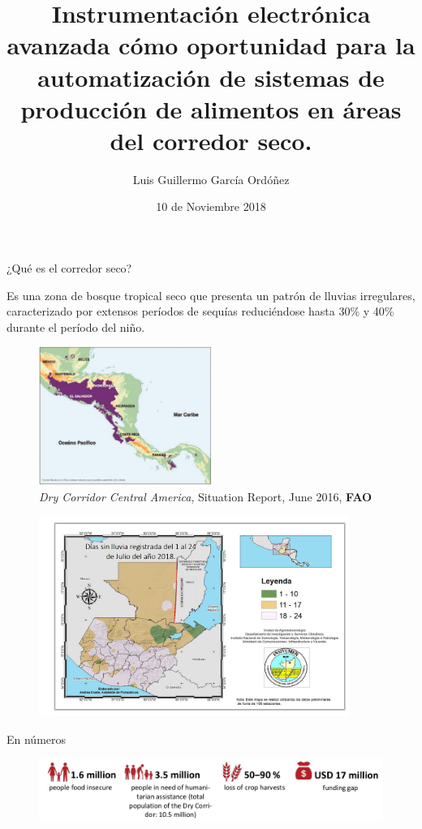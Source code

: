 \documentclass[]{beamer}
\title{Instrumentación electrónica avanzada cómo oportunidad para la automatización de sistemas de producción de alimentos en áreas del corredor seco.}
\author{Luis Guillermo García Ordóñez}
\date{10 de Noviembre 2018}
\begin{document}
\maketitle

\begin{frame}{¿Qué es el corredor seco?}

Es una zona de bosque tropical seco que presenta un patrón de lluvias irregulares, caracterizado por extensos períodos de sequías reduciéndose hasta 30\% y 40\% durante el período del niño.
\begin{figure}
    \centering
    \includegraphics[width=0.5\textwidth]{Docs/Mapa_CS}
    \caption{\small \textit{Dry Corridor Central America}, Situation Report, June 2016, \textbf{FAO}}
    \label{fig:my_label}
\end{figure}

\end{frame}

\begin{frame}{}
\begin{figure}
    \centering
    \includegraphics[width=0.9\textwidth]{Docs/diassinlluvia}
    \label{fig:my_label}
\end{figure}
\end{frame}

\begin{frame}{En números}
    \begin{figure}
        \centering
        \includegraphics{Docs/cs_in_numbers}
        \caption{}
        \label{fig:my_label}
    \end{figure}
\end{frame}
\end{document}
